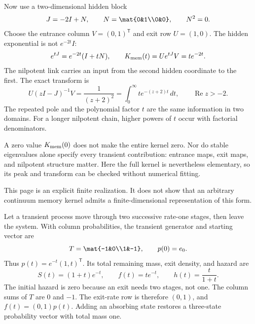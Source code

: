 Now use a two-dimensional hidden block
\[
J=-2I+N,\qquad N=\mat{0&1\\0&0},\qquad N^2=0.
\]
Choose the entrance column $V=(0,1)^{\mathsf T}$ and exit row $U=(1,0)$. The hidden exponential is not $e^{-2t}I$:
\[
e^{tJ}=e^{-2t}(I+tN),
\qquad K_{\rm mem}(t)=Ue^{tJ}V=t e^{-2t}.
\]
The nilpotent link carries an input from the second hidden coordinate to the first.
The exact transform is
\[
U(zI-J)^{-1}V=\frac1{(z+2)^2}
=\int_0^\infty t e^{-(z+2)t}\,dt,
\qquad \operatorname{Re}z>-2.
\]
The repeated pole and the polynomial factor $t$ are the same information in two domains. For a longer nilpotent chain, higher powers of $t$ occur with factorial denominators.

A zero value $K_{\rm mem}(0)$ does not make the entire kernel zero. Nor do stable eigenvalues alone specify every transient contribution: entrance maps, exit maps, and nilpotent structure matter. Here the full kernel is nevertheless elementary, so its peak and transform can be checked without numerical fitting.

This page is an explicit finite realization. It does not show that an arbitrary continuum memory kernel admits a finite-dimensional representation of this form.

Let a transient process move through two successive rate-one stages, then leave the system. With column probabilities, the transient generator and starting vector are
\[
T=\mat{-1&0\\1&-1},\qquad p(0)=e_0.
\]
Thus $p(t)=e^{-t}(1,t)^{\mathsf T}$. Its total remaining mass, exit density, and hazard are
\[
S(t)=(1+t)e^{-t},\qquad f(t)=t e^{-t},
\qquad h(t)=\frac{t}{1+t}.
\]
The initial hazard is zero because an exit needs two stages, not one.
The column sums of $T$ are $0$ and $-1$. The exit-rate row is therefore $(0,1)$, and $f(t)=(0,1)p(t)$. Adding an absorbing state restores a three-state probability vector with total mass one.

